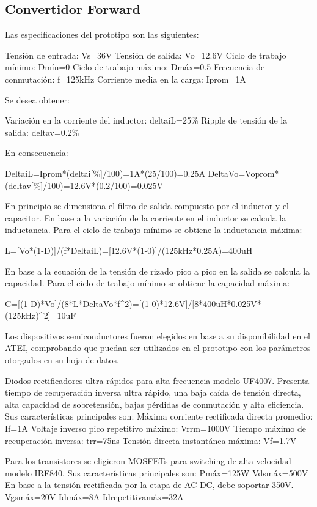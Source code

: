 \subsection{Convertidor Forward}

Las especificaciones del prototipo son las siguientes:

Tensión de entrada: Vs=36V
Tensión de salida: Vo=12.6V
Ciclo de trabajo mínimo: Dmín=0
Ciclo de trabajo máximo: Dmáx=0.5
Frecuencia de conmutación: f=125kHz
Corriente media en la carga: Iprom=1A

Se desea obtener:

Variación en la corriente del inductor: deltaiL=25\%
Ripple de tensión de la salida: deltav=0.2\%

En consecuencia:

DeltaiL=Iprom*(deltai[\%]/100)=1A*(25/100)=0.25A
DeltaVo=Voprom*(deltav[\%]/100)=12.6V*(0.2/100)=0.025V

En principio se dimensiona el filtro de salida compuesto por el inductor y el capacitor. 
En base a la variación de la corriente en el inductor se calcula la inductancia.
Para el ciclo de trabajo mínimo se obtiene la inductancia máxima:

L=[Vo*(1-D)]/(f*DeltaiL)=[12.6V*(1-0)]/(125kHz*0.25A)=400uH
$$ $$

En base a la ecuación de la tensión de rizado pico a pico en la salida se calcula la capacidad.
Para el ciclo de trabajo mínimo se obtiene la capacidad máxima:

C=[(1-D)*Vo]/(8*L*DeltaVo*f^2)=[(1-0)*12.6V]/[8*400uH*0.025V*(125kHz)^2]=10uF
$$ $$

Los dispositivos semiconductores fueron elegidos en base a su disponibilidad en el ATEI,
comprobando que puedan ser utilizados en el prototipo con los parámetros otorgados en su hoja de datos.  

Diodos rectificadores ultra rápidos para alta frecuencia modelo UF4007. 
Presenta tiempo de recuperación inversa ultra rápido, una baja caída de tensión directa, alta capacidad de sobretensión, bajas pérdidas de conmutación y alta eficiencia.
Sus características principales son: 
Máxima corriente rectificada directa promedio: If=1A
Voltaje inverso pico repetitivo máximo: Vrrm=1000V
Tiempo máximo de recuperación inversa: trr=75ns
Tensión directa instantánea máxima: Vf=1.7V

Para los transistores se eligieron MOSFETs para switching de alta velocidad modelo IRF840. 
Sus características principales son: 
Pmáx=125W
Vdsmáx=500V
En base a la tensión rectificada por la etapa de AC-DC, debe soportar 350V. 
Vgsmáx=20V
Idmáx=8A
Idrepetitivamáx=32A